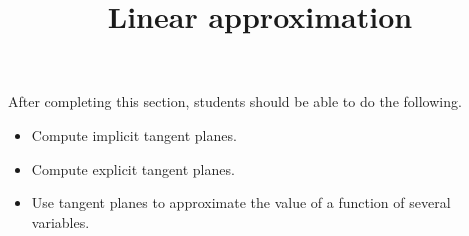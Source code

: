 \documentclass{ximera}
\title{Linear approximation}
\begin{document}
\begin{abstract}
\end{abstract}

\maketitle

\begin{sectionOutcomes}

After completing this section, students should be able to do the following.

\begin{itemize}
\item Compute implicit tangent planes.
\item Compute explicit tangent planes.
\item Use tangent planes to approximate the value of a function of
  several variables.
\end{itemize}

\end{sectionOutcomes}
\end{document}
